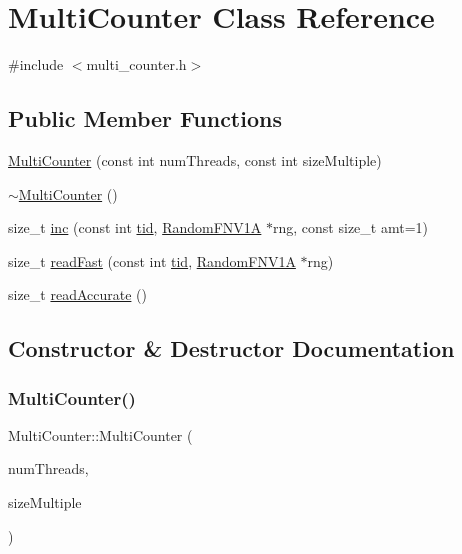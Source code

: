 \hypertarget{classMultiCounter}{}\section{Multi\+Counter Class Reference}
\label{classMultiCounter}


{\ttfamily \#include $<$multi\+\_\+counter.\+h$>$}

\subsection*{Public Member Functions}
\begin{DoxyCompactItemize}
\item 
\hyperlink{classMultiCounter_a50bec5a0b847f547de8f4a2363f09d23}{Multi\+Counter} (const int num\+Threads, const int size\+Multiple)
\item 
\hyperlink{classMultiCounter_a1e8f2f3db28990aee81a4edcf6299812}{$\sim$\+Multi\+Counter} ()
\item 
size\+\_\+t \hyperlink{classMultiCounter_a6489735d57e1550c4c5b5dbfd188b5af}{inc} (const int \hyperlink{microbench_2main_8cpp_a9ca9869868fe7e7a38a921cc7de4103f}{tid}, \hyperlink{classRandomFNV1A}{Random\+F\+N\+V1A} $\ast$rng, const size\+\_\+t amt=1)
\item 
size\+\_\+t \hyperlink{classMultiCounter_a70fb0fd4c01d29e880421eb9aed27757}{read\+Fast} (const int \hyperlink{microbench_2main_8cpp_a9ca9869868fe7e7a38a921cc7de4103f}{tid}, \hyperlink{classRandomFNV1A}{Random\+F\+N\+V1A} $\ast$rng)
\item 
size\+\_\+t \hyperlink{classMultiCounter_a049975cbc90e1f74438347869d2d43e5}{read\+Accurate} ()
\end{DoxyCompactItemize}


\subsection{Constructor \& Destructor Documentation}
\mbox{\label{classMultiCounter_a50bec5a0b847f547de8f4a2363f09d23}} 
\subsubsection{\texorpdfstring{Multi\+Counter()}{MultiCounter()}}
{\footnotesize\ttfamily Multi\+Counter\+::\+Multi\+Counter (\begin{DoxyParamCaption}\item[{const int}]{num\+Threads,  }\item[{const int}]{size\+Multiple }\end{DoxyParamCaption})\hspace{0.3cm}{\ttfamily [inline]}}

